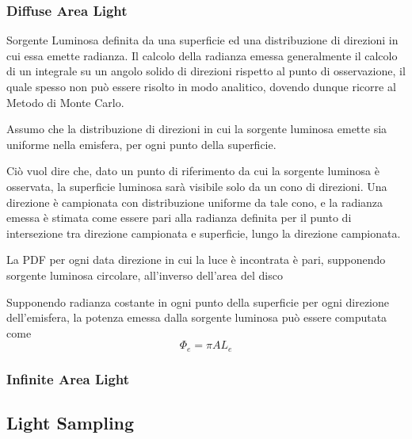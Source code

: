 \subsubsection{Diffuse Area Light}
Sorgente Luminosa definita da una superficie ed una distribuzione di direzioni in cui essa emette radianza. Il calcolo della radianza emessa 
generalmente il calcolo di un integrale su un angolo solido di direzioni rispetto al punto di osservazione, il quale spesso non pu\`o essere 
risolto in modo analitico, dovendo dunque ricorre al Metodo di Monte Carlo.\par
Assumo che la distribuzione di direzioni in cui la sorgente luminosa emette sia uniforme nella emisfera, per ogni punto della superficie.\par
Ci\`o vuol dire che, dato un punto di riferimento da cui la sorgente luminosa \`e osservata, la superficie luminosa sar\`a visibile solo da un
cono di direzioni. Una direzione \`e campionata con distribuzione uniforme da tale cono, e la radianza emessa \`e stimata come essere pari alla 
radianza definita per il punto di intersezione tra direzione campionata e superficie, lungo la direzione campionata.\par
La PDF per ogni data direzione in cui la luce \`e incontrata \`e pari, supponendo sorgente luminosa circolare, all'inverso dell'area del disco\par
Supponendo radianza costante in ogni punto della superficie per ogni direzione dell'emisfera, la potenza emessa dalla sorgente luminosa pu\`o essere 
computata come 
\begin{equation}
	\Phi_e = \pi AL_e
\end{equation}
\subsubsection{Infinite Area Light}

\subsection{Light Sampling}
